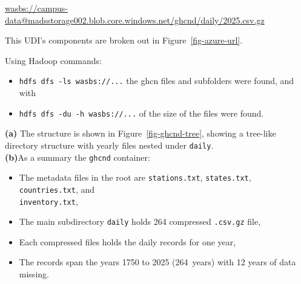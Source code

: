 \documentclass[11pt]{article}
\begin{document}
\begin{center}
    \url{wasbs://campus-data@madsstorage002.blob.core.windows.net/ghcnd/daily/2025.csv.gz}
    \end{center}

    This UDI's components are broken out in Figure~\ref{fig-azure-url}.  
    
    Using Hadoop commands: 
     \begin{itemize}
        \item \texttt{hdfs dfs -ls    wasbs://...} the ghcn files and subfolders were found, and with
        \item \texttt{hdfs dfs -du -h wasbs://...} of the size of the files were found.
    \end{itemize}
    \textbf{(a)} The structure is shown in Figure~\ref{fig-ghcnd-tree}, showing a tree-like directory structure with yearly files nested under \texttt{daily}.\\
    \textbf{(b)}As a summary  the \texttt{ghcnd} container: 
    \begin{itemize}
        \item The metadata files in the root are \texttt{stations.txt}, \texttt{states.txt}, \texttt{countries.txt}, and\\ \texttt{inventory.txt},
        
        \item The main subdirectory \texttt{daily}  holds 264 compressed \texttt{.csv.gz} file, 
        \item Each compressed files holds the daily records for one year, 
        \item The records span the years 1750 to 2025 (264 years) with 12 years of data missing. 
    \end{itemize}
    
\end{document}
